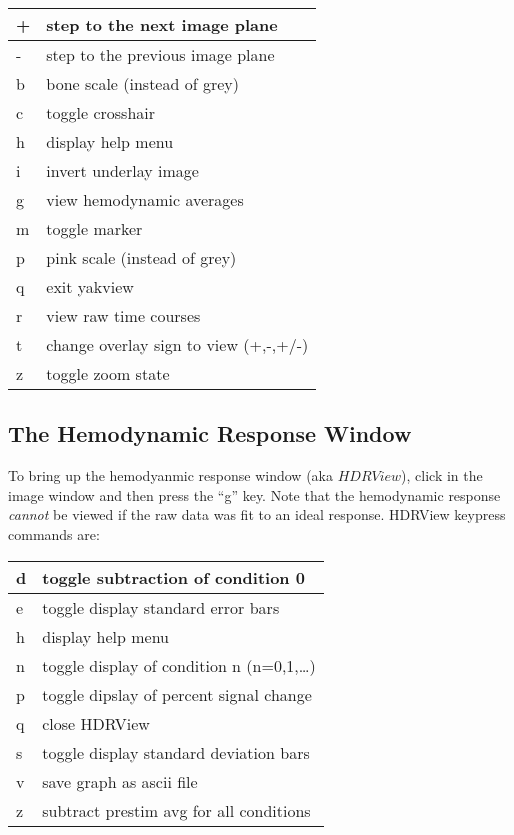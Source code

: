 \documentclass[10pt]{article}
\begin{document}
\begin{table}[h]
\begin{center}
\begin{tabular}{|l|l|}\hline
+ & step to the next image plane \\ \hline
- & step to the previous image plane \\ \hline
b & bone scale  (instead of grey) \\ \hline
c & toggle crosshair \\ \hline
h & display help menu \\ \hline
i & invert underlay image\\ \hline
g & view hemodynamic averages \\ \hline
m & toggle marker \\ \hline
p & pink scale  (instead of grey) \\ \hline
q & exit yakview \\ \hline
r & view raw time courses \\ \hline
t & change overlay sign to view (+,-,+/-) \\ \hline
z & toggle zoom state \\ \hline
\end{tabular}
\end{center}
\end{table}

\subsection{The Hemodynamic Response Window}

To bring up the hemodyanmic response window (aka $HDRView$), click in
the image window and then press the ``g'' key.  Note that the
hemodynamic response {\em cannot} be viewed if the raw data was fit to
an ideal response. HDRView keypress commands are:

\begin{table}[h]
\begin{center}
\begin{tabular}{|l|l|}\hline
d & toggle subtraction of condition 0 \\ \hline
e & toggle display standard error bars \\ \hline
h & display help menu \\ \hline
n & toggle display of condition n (n=0,1,\ldots) \\ \hline
p & toggle dipslay of percent signal change \\ \hline
q & close HDRView \\ \hline
s & toggle display standard deviation bars \\ \hline
v & save graph as ascii file \\ \hline
z & subtract prestim avg for all conditions\\ \hline
\end{tabular}
\end{center}
\end{table}
\end{document}
